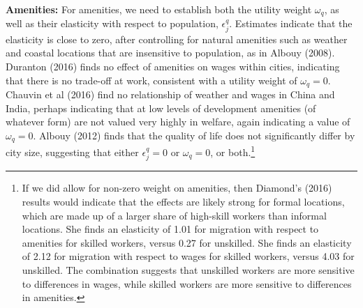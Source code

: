 \documentclass[10pt]{article}
\begin{document}
\textbf{Amenities:} 
For amenities, we need to establish both the utility weight $\omega_q$, as well as their elasticity with respect to population, $\epsilon^q_j$. Estimates indicate that the elasticity is close to zero, after controlling for natural amenities such as weather and coastal locations that are insensitive to population, as in Albouy (2008). Duranton (2016) finds no effect of amenities on wages within cities, indicating that there is no trade-off at work, consistent with a utility weight of $\omega_q = 0$. Chauvin et al (2016) find no relationship of weather and wages in China and India, perhaps indicating that at low levels of development amenities (of whatever form) are not valued very highly in welfare, again indicating a value of $\omega_q = 0$. Albouy (2012) finds that the quality of life does not significantly differ by city size, suggesting that either $\epsilon^q_j = 0$ or $\omega_q = 0$, or both.\footnote{If we did allow for non-zero weight on amenities, then Diamond's (2016) results would indicate that the effects are likely strong for formal locations, which are made up of a larger share of high-skill workers than informal locations. She finds an elasticity of 1.01 for migration with respect to amenities for skilled workers, versus 0.27 for unskilled. She finds an elasticity of 2.12 for migration with respect to wages for skilled workers, versus 4.03 for unskilled. The combination suggests that unskilled workers are more sensitive to differences in wages, while skilled workers are more sensitive to differences in amenities.}
\end{document}
